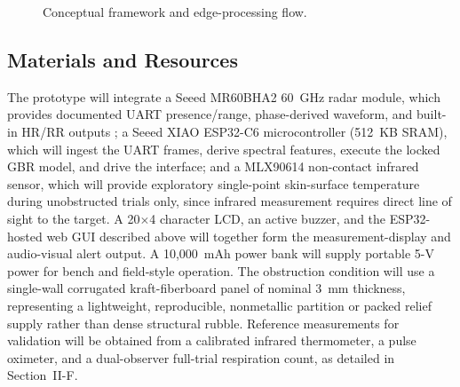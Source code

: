 \documentclass[10pt,conference]{IEEEtran}
\begin{document}
\begin{figure}[!ht]
\centering
{}
\caption{Conceptual framework and edge-processing flow.}
\label{fig:ipo}
\end{figure}

\subsection{Materials and Resources}
The prototype will integrate a Seeed MR60BHA2 60~GHz radar module, which provides documented UART presence/range, phase-derived waveform, and built-in HR/RR outputs \cite{seeed_mr60bha2}; a Seeed XIAO ESP32-C6 microcontroller (512~KB SRAM), which will ingest the UART frames, derive spectral features, execute the locked GBR model, and drive the interface; and a MLX90614 non-contact infrared sensor, which will provide exploratory single-point skin-surface temperature during unobstructed trials only, since infrared measurement requires direct line of sight to the target. A 20$\times$4 character LCD, an active buzzer, and the ESP32-hosted web GUI described above will together form the measurement-display and audio-visual alert output. A 10{,}000~mAh power bank will supply portable 5-V power for bench and field-style operation. The obstruction condition will use a single-wall corrugated kraft-fiberboard panel of nominal 3~mm thickness, representing a lightweight, reproducible, nonmetallic partition or packed relief supply rather than dense structural rubble. Reference measurements for validation will be obtained from a calibrated infrared thermometer, a pulse oximeter, and a dual-observer full-trial respiration count, as detailed in Section~II-F.
\end{document}
